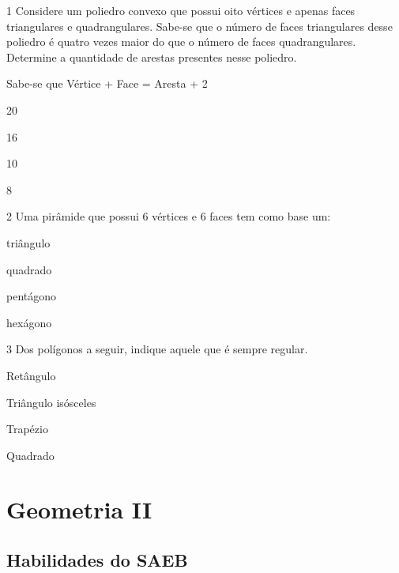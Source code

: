 \begin{escolha}
\begin{escolha}
\num{1} Considere um poliedro convexo que possui oito vértices e apenas faces
triangulares e quadrangulares. Sabe-se que o número de faces
triangulares desse poliedro é quatro vezes maior do que o número de
faces quadrangulares. Determine a quantidade de arestas presentes nesse
poliedro.

Sabe-se que Vértice + Face = Aresta + 2

\begin{escolha}
  \item 20

  \item 16

  \item 10

  \item 8
\begin{escolha}


\num{2} Uma pirâmide que possui 6 vértices e 6 faces tem como base um:

\begin{escolha}
  \item triângulo

  \item quadrado

  \item pentágono

  \item hexágono
\end{escolha}


\num{3} Dos polígonos a seguir, indique aquele que é sempre regular.

\begin{escolha}
  \item Retângulo

  \item Triângulo isósceles

  \item Trapézio

  \item Quadrado
\end{escolha}

\chapter{Geometria II}

\section{Habilidades do SAEB}


\end{escolha}
\end{escolha}
\end{escolha}
\end{escolha}
